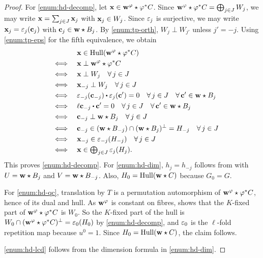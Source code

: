 \documentclass[twocolumn, 11pt]{scrartcl}
\begin{document}
\begin{proof}
    For \ref{enum:hd-decomp}, let $\mathbf{x}\in\mathbf{w}^\varphi\star\varphi^*C$. Since $\mathbf{w}^\varphi\star\varphi^*C=\bigoplus_{j\in J} W_j$, we may write $\mathbf{x}=\sum_{j\in J}\mathbf{x}_j$ with $\mathbf{x}_j\in W_j$. Since $\varepsilon_{j}$ is surjective, we may write $\mathbf{x}_{j}=\varepsilon_{j}(\mathbf{c}_j)$ with $\mathbf{c}_j\in\mathbf{w}\star B_{j}$. By \ref{enum:tp-orth}, $W_j\perp W_{j'}$ unless $j'=-j$. Using \ref{enum:tp-eps} for the fifth equivalence, we obtain
    \begin{align*}
             & \bfx\in\Hull(\bfw^\varphi\star\varphi^*C) \\
        \qiff& \bfx\perp\bfw^\varphi\star \varphi^*C \\
        \qiff& \bfx\perp W_j\quad\forall j\in J \\
        \qiff& \bfx_{-j}\perp W_j\quad\forall j\in J \\
        \qiff& \eps_{-j}(\bfc_{-j})\dotpr\eps_j(\bfc')=0\quad\forall j\in J\quad\forall \bfc'\in\bfw\star B_j \\
        \qiff& \ell\bfc_{-j}\dotpr\bfc'=0 \quad\forall j\in J\quad\forall\bfc'\in\bfw\star B_j \\
        \qiff& \bfc_{-j}\perp\bfw\star B_j\quad\forall j\in J \\
        \qiff& \bfc_{-j}\in(\bfw\star B_{-j})\cap(\bfw\star B_j)^\perp=H_{-j}\quad\forall j\in J \\
        \qiff& \bfx_{-j}\in\eps_{-j}(H_{-j})\quad\forall j\in J \\
        \qiff& \textstyle \bfx\in\bigoplus_{j\in J}\eps_j(H_j).
    \end{align*}
    This proves \ref{enum:hd-decomp}. For \ref{enum:hd-dim}, $h_j=h_{-j}$ follows from  with $U=\mathbf{w}\star B_j$ and $V=\mathbf{w}\star B_{-j}$. Also, $H_0=\operatorname{Hull}(\mathbf{w}\star C)$ because $G_0=G$.
    
    For \ref{enum:hd-qc}, translation by $T$ is a permutation automorphism of $\mathbf{w}^\varphi\star\varphi^*C$, hence of its dual and hull. As $\mathbf{w}^\varphi$ is constant on fibres,  shows that the $K$-fixed part of $\mathbf{w}^\varphi\star\varphi^*C$ is $W_0$. So the $K$-fixed part of the hull is $W_0\cap(\mathbf{w}^\varphi\star\varphi^*C)^\perp=\varepsilon_0(H_0)$ by \ref{enum:hd-decomp}, and $\varepsilon_0$ is the $\ell$-fold repetition map because $u^0=1$. Since $H_0=\operatorname{Hull}(\mathbf{w}\star C)$, the claim follows.
    
    \ref{enum:hd-lcd} follows from the dimension formula in \ref{enum:hd-dim}.
\end{proof}
\end{document}

